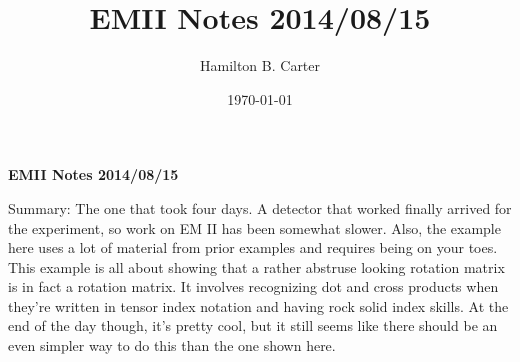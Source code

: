 \documentclass[prb,preprint]
{revtex4-1}
\begin{document}

\title{EMII Notes 2014/08/15}

\author{Hamilton B. Carter}



\date{\today}









\centerline{\bf EMII Notes 2014/08/15}
\bigskip

Summary:  The one that took four days.  A detector that worked finally arrived for the experiment, so work on EM II has been somewhat slower.  Also, the example here uses a lot of material from prior examples and requires being on your toes.  This example is all about showing that a rather abstruse looking rotation matrix is in fact a rotation matrix.  It involves recognizing dot and cross products when they're written in tensor index notation and having rock solid index skills.  At the end of the day though, it's pretty cool, but it still seems like there should be an even simpler way to do this than the one shown here.
\end{document}
